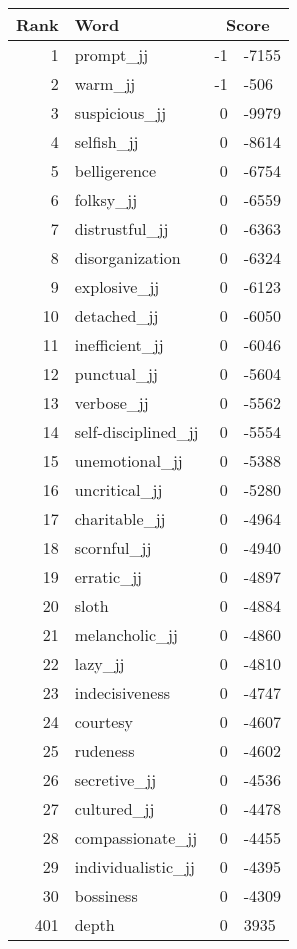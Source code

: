 \begin{longtable}[!htbp]{| rlr@{.}l |}
    \hline
    \textbf{Rank} & \textbf{Word} & \multicolumn{2}{c|}{\textbf{Score}} \\
    \hline
    \endhead
    1 & prompt\_jj & -1 & -7155 \\
    2 & warm\_jj & -1 & -506 \\
    3 & suspicious\_jj & 0 & -9979 \\
    4 & selfish\_jj & 0 & -8614 \\
    5 & belligerence & 0 & -6754 \\
    6 & folksy\_jj & 0 & -6559 \\
    7 & distrustful\_jj & 0 & -6363 \\
    8 & disorganization & 0 & -6324 \\
    9 & explosive\_jj & 0 & -6123 \\
    10 & detached\_jj & 0 & -6050 \\
    11 & inefficient\_jj & 0 & -6046 \\
    12 & punctual\_jj & 0 & -5604 \\
    13 & verbose\_jj & 0 & -5562 \\
    14 & self-disciplined\_jj & 0 & -5554 \\
    15 & unemotional\_jj & 0 & -5388 \\
    16 & uncritical\_jj & 0 & -5280 \\
    17 & charitable\_jj & 0 & -4964 \\
    18 & scornful\_jj & 0 & -4940 \\
    19 & erratic\_jj & 0 & -4897 \\
    20 & sloth & 0 & -4884 \\
    21 & melancholic\_jj & 0 & -4860 \\
    22 & lazy\_jj & 0 & -4810 \\
    23 & indecisiveness & 0 & -4747 \\
    24 & courtesy & 0 & -4607 \\
    25 & rudeness & 0 & -4602 \\
    26 & secretive\_jj & 0 & -4536 \\
    27 & cultured\_jj & 0 & -4478 \\
    28 & compassionate\_jj & 0 & -4455 \\
    29 & individualistic\_jj & 0 & -4395 \\
    30 & bossiness & 0 & -4309 \\
    401 & depth & 0 & 3935 \\

\end{longtable}
